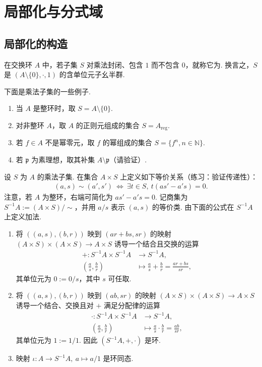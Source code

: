 \section{局部化与分式域}\label{sec:galois-1-6}
\subsection{局部化的构造}\label{sec:galois-1-6-1}
在交换环 $A$ 中，若子集 $S$ 对乘法封闭、包含 $1$ 而不包含 $0$，就称它为. 换言之，$S$ 是 $(A\setminus\{0\},\cdot,1)$ 的含单位元子幺半群.
\begin{example*}
下面是乘法子集的一些例子.
\begin{enumerate}
\item 当 $A$ 是整环时，取 $S=A\setminus\{0\}$.
\item 对非整环 $A$，取 $A$ 的正则元组成的集合 $S=A_{\mathrm{reg}}$.
\item 若 $f\in A$ 不是幂零元，取 $f$ 的幂组成的集合 $S=\{f^n,n\in\mathbb N\}$.
\item 若 $\mathfrak p$ 为素理想，取其补集 $A\setminus\mathfrak p$（请验证）.
\end{enumerate}
\end{example*}
设 $S$ 为 $A$ 的乘法子集. 在集合 $A\times S$ 上定义如下等价关系（练习：验证传递性）：
\begin{align*}
(a,s)\sim(a',s')\ \Longleftrightarrow\ \exists t\in S,\ t(as'-a's)=0.
\end{align*}
注意，若 $A$ 为整环，右端可简化为 $as'-a's=0$. 记商集为 $S^{-1}A:=(A\times S)/\sim$，并用 $a/s$ 表示 $(a,s)$ 的等价类. 由下面的公式在 $S^{-1}A$ 上定义加法.
\begin{lemma*}
\begin{enumerate}[label=\roman*)]
\item 将 $((a,s),(b,r))$ 映到 $(ar+bs,sr)$ 的映射 $(A\times S)\times(A\times S)\longrightarrow A\times S$ 诱导一个结合且交换的运算
\begin{align*}
+:S^{-1}A\times S^{-1}A&\longrightarrow S^{-1}A,\\
\left(\frac as,\frac br\right)&\longmapsto\frac as+\frac br=\frac{ar+bs}{sr},
\end{align*}
其单位元为 $0:=0/s$，其中 $s$ 可任取.
\item 将 $((a,s),(b,r))$ 映到 $(ab,sr)$ 的映射 $(A\times S)\times(A\times S)\longrightarrow A\times S$ 诱导一个结合、交换且对 $+$ 满足分配律的运算
\begin{align*}
\cdot:S^{-1}A\times S^{-1}A&\longrightarrow S^{-1}A,\\
\left(\frac as,\frac br\right)&\longmapsto\frac as\cdot\frac br=\frac{ab}{sr},
\end{align*}
其单位元为 $1:=1/1$. 因此 $(S^{-1}A,+,\cdot)$ 是环.
\item 映射 $\iota:A\longrightarrow S^{-1}A,\ a\mapsto a/1$ 是环同态.
\end{enumerate}
\end{lemma*}
